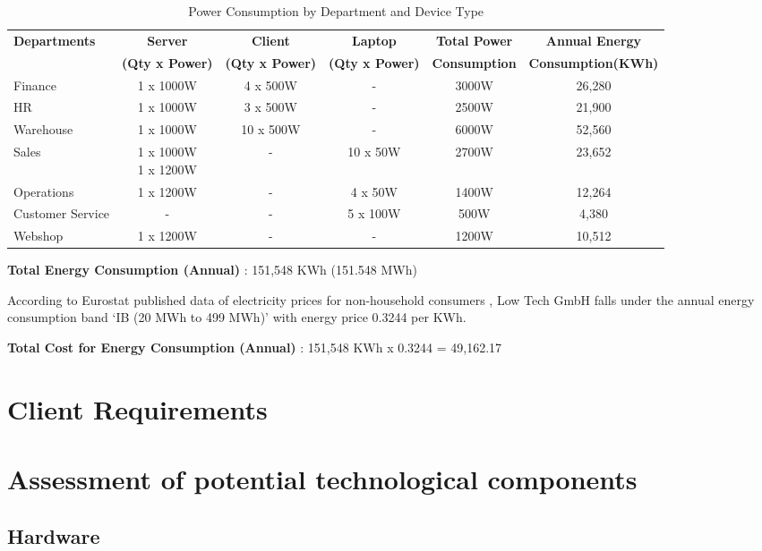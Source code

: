 \documentclass{llncs}
\begin{document}
\begin{table}[htbp]
\centering
\begin{tabular}{|l|c|c|c|c|c|}
\hline
\textbf{Departments} & \textbf{Server} & \textbf{Client} & \textbf{Laptop} & \textbf{Total Power} & \textbf{Annual Energy}  \\
 & \textbf{ (Qty x Power) } & \textbf{ (Qty x Power) } & \textbf{ (Qty x Power) } & \textbf{ Consumption } & \textbf{ Consumption(KWh) } \\
\hline
Finance & 1 x 1000W & 4 x 500W & - & 3000W & 26,280 \\
\hline
HR & 1 x 1000W & 3 x 500W & - & 2500W & 21,900 \\
\hline
Warehouse & 1 x 1000W & 10 x 500W & - & 6000W & 52,560 \\
\hline
Sales & \makecell{1 x 1000W \\ 1 x 1200W} & - & 10 x 50W & 2700W & 23,652 \\
\hline
Operations & 1 x 1200W & - & 4 x 50W & 1400W & 12,264\\
\hline
Customer Service & - & - & 5 x 100W & 500W & 4,380 \\
\hline
Webshop & 1 x 1200W & - & - & 1200W & 10,512\\
\hline
\end{tabular}
\caption{Power Consumption by Department and Device Type}
\label{tab:power_consumption}
\end{table}

\textbf{Total Energy Consumption (Annual)} : 151,548 KWh (151.548 MWh)

According to Eurostat published data of electricity prices for non-household consumers \cite{eurostat2023}, Low Tech GmbH falls under the annual energy consumption band 
`IB (20 MWh to 499 MWh)' with energy price 0.3244 \EUR{} per KWh.


\textbf{Total Cost for Energy Consumption (Annual)} : 151,548 KWh x 0.3244 \EUR{} = 49,162.17 \EUR{}


\section{Client Requirements}

\section{Assessment of potential technological components}

\subsection{Hardware}
\end{document}
